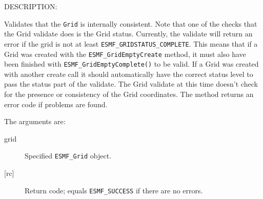 {\sf DESCRIPTION:\\ }


        Validates that the {\tt Grid} is internally consistent.
        Note that one of the checks that the Grid validate does
        is the Grid status. Currently, the validate will return
        an error if the grid is not at least
        {\tt ESMF\_GRIDSTATUS\_COMPLETE}. This means that
        if a Grid was created with the {\tt ESMF\_GridEmptyCreate}
        method, it must also have been finished with
        {\tt ESMF\_GridEmptyComplete()}
        to be valid. If a Grid was created with another create
        call it should automatically have the correct status level
        to pass the status part of the validate.
        The Grid validate at this time doesn't check for the presence
        or consistency of the Grid coordinates.
        The method returns an error code if problems are found.
  
       The arguments are:
       \begin{description}
       \item[grid]
            Specified {\tt ESMF\_Grid} object.
       \item[{[rc]}]
            Return code; equals {\tt ESMF\_SUCCESS} if there are no errors.
       \end{description}
  
\setlength{\parskip}{\oldparskip}
\setlength{\parindent}{\oldparindent}
\setlength{\baselineskip}{\oldbaselineskip}
